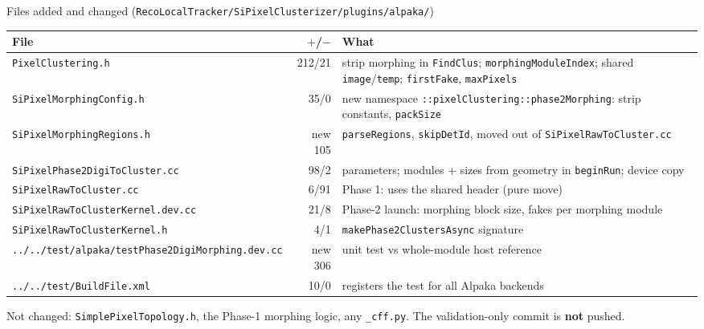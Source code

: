 \documentclass[aspectratio=169,10pt,xcolor=table]{beamer}
\newcommand{\pos}[1]{\textcolor{cbBlue}{#1}}
\newcommand{\code}[1]{\texttt{\small #1}}
\begin{document}
\begin{frame}{Files added and changed (\code{RecoLocalTracker/SiPixelClusterizer/plugins/alpaka/})}
  \vspace{2pt}
  \begin{center}\footnotesize
  \begin{tabular}{@{}>{\raggedright\arraybackslash}p{}r>{\raggedright\arraybackslash}p{}@{}}
    \toprule
    File & $+$/$-$ & What \\
    \midrule
    \code{PixelClustering.h} & 212/21 & strip morphing in \code{FindClus}; \code{morphingModuleIndex}; shared \code{image}/\code{temp}; \code{firstFake}, \code{maxPixels} \\
    \code{SiPixelMorphingConfig.h} & 35/0 & new namespace \code{::pixelClustering::phase2Morphing}: strip constants, \code{packSize} \\
    \code{SiPixelMorphingRegions.h} & \pos{new} 105 & \code{parseRegions}, \code{skipDetId}, moved out of \code{SiPixelRawToCluster.cc} \\
    \code{SiPixelPhase2DigiToCluster.cc} & 98/2 & 4 parameters; modules + sizes from geometry in \code{beginRun}; device copy \\
    \code{SiPixelRawToCluster.cc} & 6/91 & Phase 1: uses the shared header (pure move) \\
    \code{SiPixelRawToClusterKernel.dev.cc} & 21/8 & Phase-2 launch: morphing block size, fakes per morphing module \\
    \code{SiPixelRawToClusterKernel.h} & 4/1 & \code{makePhase2ClustersAsync} signature \\
    \code{../../test/alpaka/}\newline\code{testPhase2DigiMorphing.dev.cc} & \pos{new} 306 & unit test vs whole-module host reference \\
    \code{../../test/BuildFile.xml} & 10/0 & registers the test for all Alpaka backends \\
    \bottomrule
  \end{tabular}
  \end{center}
  {\footnotesize Not changed: \code{SimplePixelTopology.h}, the Phase-1 morphing logic, any \code{\_cff.py}. The validation-only commit is \textbf{not} pushed.}
\end{frame}
\end{document}
